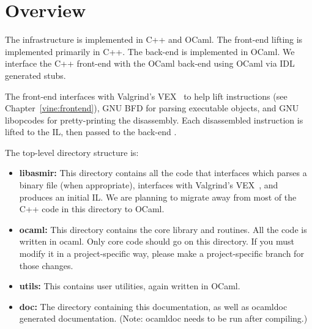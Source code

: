 \section{Overview}

The \bap infrastructure is implemented in C++ and OCaml.  The
front-end lifting is implemented primarily in C++.  The back-end is
implemented in OCaml. We interface the C++ front-end with the OCaml
back-end using OCaml via IDL generated stubs.

The front-end interfaces with Valgrind's
VEX~\cite{nethercote:2004:phd} to help lift instructions (see
Chapter~\ref{vine:frontend}), GNU BFD for parsing executable objects,
and GNU libopcodes for pretty-printing the disassembly. Each
disassembled instruction is lifted to the IL, then passed to the
back-end .  

The \bap top-level directory structure is:
\begin{itemize}\squish
\item {\bf libasmir:} This directory contains all the code that
  interfaces which parses a binary file (when appropriate), interfaces
  with Valgrind's VEX~\cite{nethercote:2004:phd}, and produces an
  initial IL.  We are planning to migrate away from most of the
  C++ code in this directory to OCaml.

\item {\bf ocaml:} This directory contains the core \bap library and
  routines. All the code is written in ocaml. Only core \bap code
  should go on this directory. If you must modify it in a
  project-specific way, please make a project-specific branch for
  those changes.

\item {\bf utils:} This contains user utilities, again written in OCaml.

\item {\bf doc:} The directory containing this documentation, as well
  as ocamldoc generated documentation. (Note: ocamldoc needs to be run
  after compiling.)
\end{itemize}
